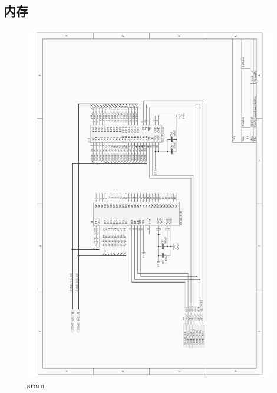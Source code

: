 \documentclass[titlepage]{article}
\begin{document}
 \subsection{内存}
 \begin{figure}[h]
  \centering
 \includegraphics[width=11cm]{sram.pdf}
 \caption{sram}
 \end{figure}

 \newpage
\end{document}

